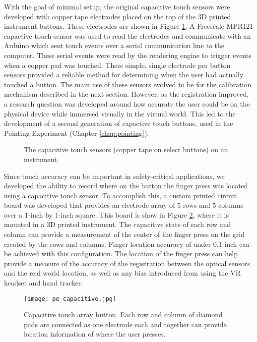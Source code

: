 With the goal of minimal setup, the original capacitive touch sensors were developed with copper tape electrodes placed on the top of the 3D printed instrument buttons.
These electrodes are shown in Figure \ref{fig:proto_mfd_capacitive}.
A Freescale MPR121 capactive touch sensor was used to read the electrodes and communicate with an Arduino which sent touch events over a serial communication line to the computer.
These serial events were read by the rendering engine to trigger events when a copper pad was touched.
These simple, single electrode per button sensors provided a reliable method for determining when the user had actually touched a button.
The main use of these sensors evolved to be for the calibration mechanism described in the next section.
However, as the registration improved, a research question was developed around how accurate the user could be on the physical device while immersed visually in the virtual world.
This led to the development of a second generation of capactive touch buttons, used in the Pointing Experiment (Chapter \ref{chap:pointing}).

\begin{figure}
    \centering
    \caption{The capacitive touch sensors (copper tape on select buttons) on an instrument.}
    \label{fig:proto_mfd_capacitive}
\end{figure}

Since touch accuracy can be important in safety-critical applications, we developed the ability to record where on the button the finger press was located using a capacitive touch sensor.
To accomplish this, a custom printed circuit board was developed that provides an electrode array of 5 rows and 5 columns over a 1-inch by 1-inch square.
This board is show in Figure \ref{fig:proto_capacitive_array}, where it is mounted in a 3D printed instrument.
The capacitive state of each row and column can provide a measurement of the center of the finger press on the grid created by the rows and columns.
Finger location accuracy of under 0.1-inch can be achieved with this configuration.
The location of the finger press can help provide a measure of the accuracy of the registration between the optical sensors and the real world location, as well as any bias introduced from using the VR headset and hand tracker.

\begin{figure}
    \centering
    \texttt{[image: pe\_capacitive.jpg]}
    \caption{Capacitive touch array button. Each row and column of diamond pads are connected as one electrode each and together can provide location information of where the user presses.}
    \label{fig:proto_capacitive_array}
\end{figure}

